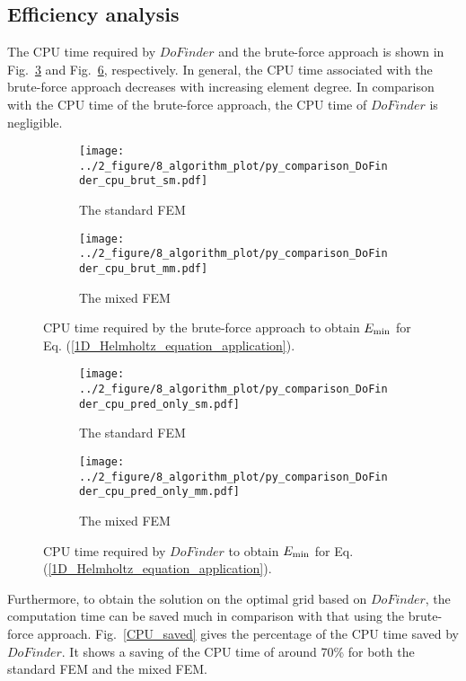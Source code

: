 \documentclass[review,3p]{elsarticle}
\begin{document}
\subsection{Efficiency analysis}				\label{section_efficiency_analysis}

The CPU time required by $DoFinder$ and the brute-force approach is shown in Fig.~\ref{CPU_brut} and Fig.~\ref{CPU_pred_only}, respectively. In general, the CPU time associated with the brute-force approach decreases with increasing element degree. In comparison with the CPU time of the brute-force approach, the CPU time of $DoFinder$ is negligible.

\begin{figure}[!ht]
	\centering
    \begin{subfigure}{6.0cm}
        \texttt{[image: ../2\_figure/8\_algorithm\_plot/py\_comparison\_DoFinder\_cpu\_brut\_sm.pdf]}
        \caption{The standard FEM}
        \label{CPU_brut_sm}
    \end{subfigure}
    \begin{subfigure}{6.0cm}	                		 	
        \texttt{[image: ../2\_figure/8\_algorithm\_plot/py\_comparison\_DoFinder\_cpu\_brut\_mm.pdf]}
        \caption{The mixed FEM}
        \label{CPU_brut_mm}
    \end{subfigure}
\caption{CPU time required by the brute-force approach to obtain $E_{\rm min}$ for Eq. (\ref{1D_Helmholtz_equation_application}).}
\label{CPU_brut}
\end{figure}

\begin{figure}[!ht]
	\centering
    \begin{subfigure}{6.0cm}
        \texttt{[image: ../2\_figure/8\_algorithm\_plot/py\_comparison\_DoFinder\_cpu\_pred\_only\_sm.pdf]}
        \caption{The standard FEM}
        \label{CPU_pred_only_sm}
    \end{subfigure}
    \begin{subfigure}{6.0cm}	                		 	
        \texttt{[image: ../2\_figure/8\_algorithm\_plot/py\_comparison\_DoFinder\_cpu\_pred\_only\_mm.pdf]}
        \caption{The mixed FEM}
        \label{CPU_pred_only_mm}
    \end{subfigure}
\caption{CPU time required by $DoFinder$ to obtain $E_{\rm min}$ for Eq. (\ref{1D_Helmholtz_equation_application}).}
\label{CPU_pred_only}
\end{figure}

Furthermore, to obtain the solution on the optimal grid based on $DoFinder$, the computation time can be saved much in comparison with that using the brute-force approach. Fig.~\ref{CPU_saved} gives the percentage of the CPU time saved by $DoFinder$. It shows a saving of the CPU time of around 70\% for both the standard FEM and the mixed FEM. 
\end{document}
